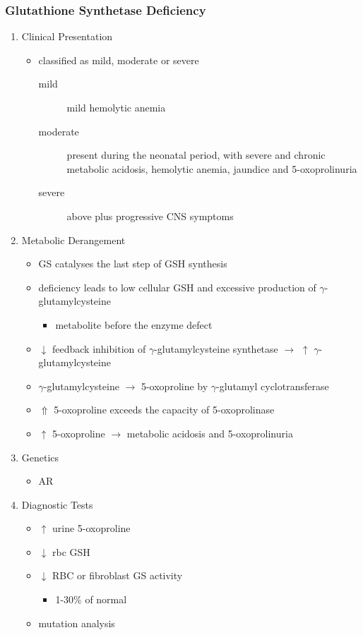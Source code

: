 \documentclass{scrartcl}
\begin{document}
\subsubsection{Glutathione Synthetase Deficiency}
\label{sec:org8248c4d}
\begin{enumerate}
\item Clinical Presentation
\label{sec:orgf9f8ffb}
\begin{itemize}
\item classified as mild, moderate or severe
\begin{description}
\item[{mild}] mild hemolytic anemia
\item[{moderate}] present during the neonatal period, with severe and
chronic metabolic acidosis, hemolytic anemia, jaundice
and 5-oxoprolinuria
\item[{severe}] above plus progressive CNS symptoms
\end{description}
\end{itemize}

\item Metabolic Derangement
\label{sec:orge5328bf}
\begin{itemize}
\item GS catalyses the last step of GSH synthesis
\item deficiency leads to low cellular GSH and excessive production of
\(\gamma\)-glutamylcysteine
\begin{itemize}
\item metabolite before the enzyme defect
\end{itemize}
\item \(\downarrow\) feedback inhibition of \(\gamma\)-glutamylcysteine synthetase
\(\to\) \(\uparrow\) \(\gamma\)-glutamylcysteine
\item \(\gamma\)-glutamylcysteine \(\to\) 5-oxoproline by \(\gamma\)-glutamyl
cyclotransferase
\item \(\Uparrow\) 5-oxoproline exceeds the capacity of 5-oxoprolinase
\item \(\uparrow\) 5-oxoproline \(\to\) metabolic acidosis and 5-oxoprolinuria
\end{itemize}

\item Genetics
\label{sec:org5f16a87}
\begin{itemize}
\item AR
\end{itemize}

\item Diagnostic Tests
\label{sec:org897b44a}
\begin{itemize}
\item \(\uparrow\) urine 5-oxoproline
\item \(\downarrow\) rbc GSH
\item \(\downarrow\) RBC or fibroblast GS activity
\begin{itemize}
\item 1-30\% of normal
\end{itemize}
\item mutation analysis
\end{itemize}


\end{enumerate}
\end{document}
